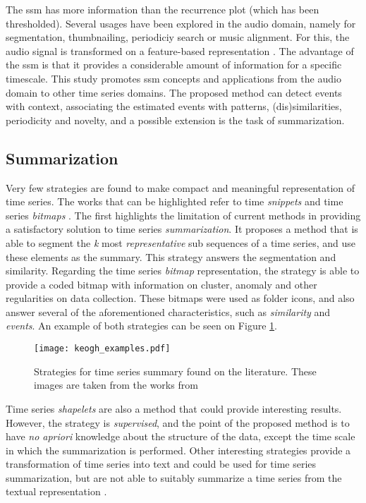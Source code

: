 The \gls{ssm} has more information than the recurrence plot (which has been thresholded). Several usages have been explored in the audio domain, namely for segmentation, thumbnailing, periodiciy search or music alignment. For this, the audio signal is transformed on a feature-based representation \cite{fmp1, fmp2}. The advantage of the \gls{ssm} is that it provides a considerable amount of information for a specific timescale. This study promotes \gls{ssm} concepts and applications from the audio domain to other time series domains. The proposed method can detect events with context, associating the estimated events with patterns, (dis)similarities, periodicity and novelty, and a possible extension is the task of summarization.

\subsection{Summarization}
\label{sec:literature_summarize}

Very few strategies are found to make compact and meaningful representation of time series. The works that can be highlighted refer to time \textit{snippets} and time series \textit{bitmaps} \cite{snippets, bitmap}. The first highlights the limitation of current methods in providing a satisfactory solution to time series \textit{summarization}. It proposes a method that is able to segment the \textit{k} most \textit{representative} sub sequences of a time series, and use these elements as the summary. This strategy answers the segmentation and similarity. Regarding the time series \textit{bitmap} representation, the strategy is able to provide a coded bitmap with information on cluster, anomaly and other regularities on data collection. These bitmaps were used as folder icons, and also answer several of the aforementioned characteristics, such as \textit{similarity} and \textit{events}. An example of both strategies can be seen on Figure \ref{fig:keogh_strat}.

\begin{figure}[t]
    \centering
    \texttt{[image: keogh\_examples.pdf]}
    \caption{Strategies for time series summary found on the literature. These images are taken from the works from \cite{snippets, bitmap}}
    \label{fig:keogh_strat}
\end{figure}

Time series \textit{shapelets} are also a method that could provide interesting results. However, the strategy is \textit{supervised}, and the point of the proposed method is to have \textit{no apriori} knowledge about the structure of the data, except the time scale in which the summarization is performed. Other interesting strategies provide a transformation of time series into text and could be used for time series summarization, but are not able to suitably summarize a time series from the textual representation \cite{ssts, sax}. 

